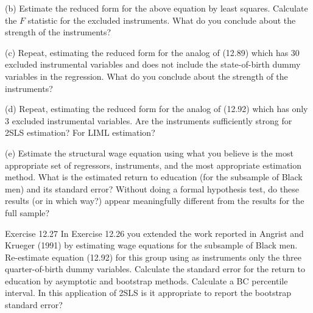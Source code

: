 \documentclass[10pt]{article}
\begin{document}
(b) Estimate the reduced form for the above equation by least squares. Calculate the $F$ statistic for the excluded instruments. What do you conclude about the strength of the instruments?

(c) Repeat, estimating the reduced form for the analog of (12.89) which has 30 excluded instrumental variables and does not include the state-of-birth dummy variables in the regression. What do you conclude about the strength of the instruments?

(d) Repeat, estimating the reduced form for the analog of (12.92) which has only 3 excluded instrumental variables. Are the instruments sufficiently strong for 2SLS estimation? For LIML estimation?

(e) Estimate the structural wage equation using what you believe is the most appropriate set of regressors, instruments, and the most appropriate estimation method. What is the estimated return to education (for the subsample of Black men) and its standard error? Without doing a formal hypothesis test, do these results (or in which way?) appear meaningfully different from the results for the full sample?

Exercise 12.27 In Exercise 12.26 you extended the work reported in Angrist and Krueger (1991) by estimating wage equations for the subsample of Black men. Re-estimate equation (12.92) for this group using as instruments only the three quarter-of-birth dummy variables. Calculate the standard error for the return to education by asymptotic and bootstrap methods. Calculate a BC percentile interval. In this application of 2SLS is it appropriate to report the bootstrap standard error?
\end{document}
